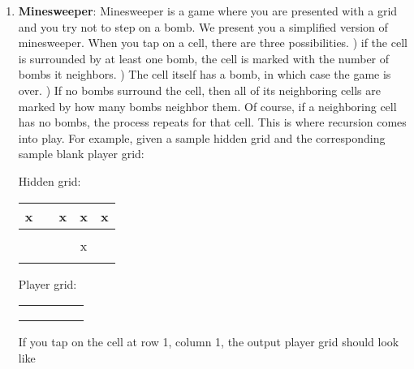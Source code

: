 \documentclass{article}
\begin{document}
\begin{enumerate}[label=(\alph*), itemsep = 120pt]
\item  \textbf{Minesweeper}: Minesweeper is a game where you are presented with a grid and you try not to step on a bomb. We present you a simplified version of minesweeper. When you tap on a cell, there are three possibilities. \newline {}) if the cell is surrounded by at least one bomb, the cell is marked with the number of bombs it neighbors. ) The cell itself has a bomb, in which case the game is over. ) If no bombs surround the cell, then all of its neighboring cells are marked by how many bombs neighbor them. Of course, if a neighboring cell has no bombs, the process repeats for that cell. This is where recursion comes into play. For example, given a sample hidden grid and the corresponding sample blank player grid: 
    \newline
    
    
   
    
     \begin{center}
      Hidden grid: \newline
    \begin{tabular}{ | c | c | c | c | c |}
    \hline
      x &  & x & x & x \\
      \hline
       &  &  &  &  \\
      \hline
       &  &  & x &  \\
      \hline
       &  &  &  &  \\
      \hline
    \end{tabular}
    \end{center}

     \begin{center}
     Player grid: \newline
    \begin{tabular}{ | c | c | c | c | c |}
    \hline
       &  &  &  &  \\
      \hline
       &  &  &  &  \\
      \hline
       &  &  &  &  \\
      \hline
       &  &  &  &  \\
      \hline
    \end{tabular}
    \end{center}

    If you tap on the cell at row 1, column 1, the output player grid should look like 


\end{enumerate}
\end{document}
